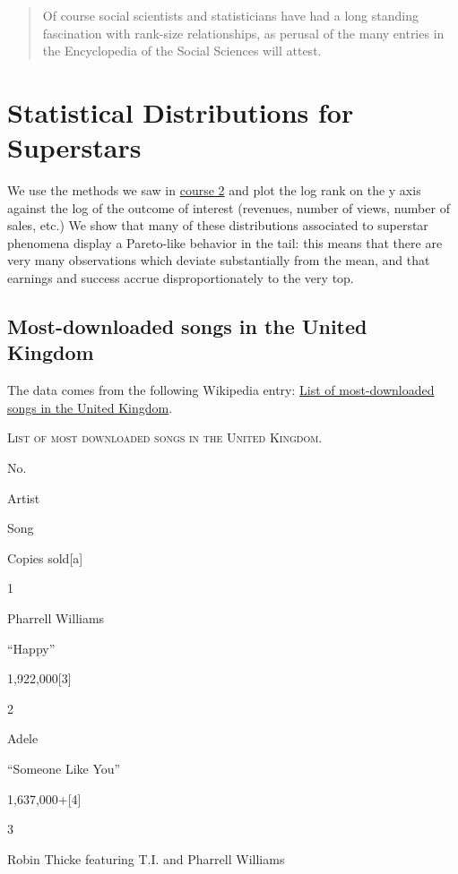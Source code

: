 \documentclass[]{book}
\theoremstyle{definition}
\theoremstyle{definition}
\theoremstyle{definition}
\theoremstyle{remark}
\begin{document}
\begin{quote}
Of course social scientists and statisticians have had a long standing
fascination with rank-size relationships, as perusal of the many entries
in the Encyclopedia of the Social Sciences will attest.
\end{quote}

\section{Statistical Distributions for
Superstars}\label{statistical-distributions-for-superstars}

We use the methods we saw in \href{course2.html}{course 2} and plot the
log rank on the y axis against the log of the outcome of interest
(revenues, number of views, number of sales, etc.) We show that many of
these distributions associated to superstar phenomena display a
Pareto-like behavior in the tail: this means that there are very many
observations which deviate substantially from the mean, and that
earnings and success accrue disproportionately to the very top.

\subsection{Most-downloaded songs in the United
Kingdom}\label{most-downloaded-songs-in-the-united-kingdom}

The data comes from the following Wikipedia entry:
\href{https://en.wikipedia.org/wiki/List_of_most-downloaded_songs_in_the_United_Kingdom}{List
of most-downloaded songs in the United Kingdom}.




\label{tab:most-download-UK-songs}\textsc{List of most downloaded songs in
the United Kingdom.}

No.

Artist

Song

Copies sold{[}a{]}

1

Pharrell Williams

``Happy''

1,922,000{[}3{]}

2

Adele

``Someone Like You''

1,637,000+{[}4{]}

3

Robin Thicke featuring T.I. and Pharrell Williams
\end{document}
